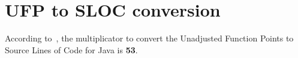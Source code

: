 \section{UFP to SLOC conversion}
According to~\cite{cocomo-manual}, the multiplicator to convert the Unadjusted Function Points to Source Lines of Code for Java is \textbf{53}.

